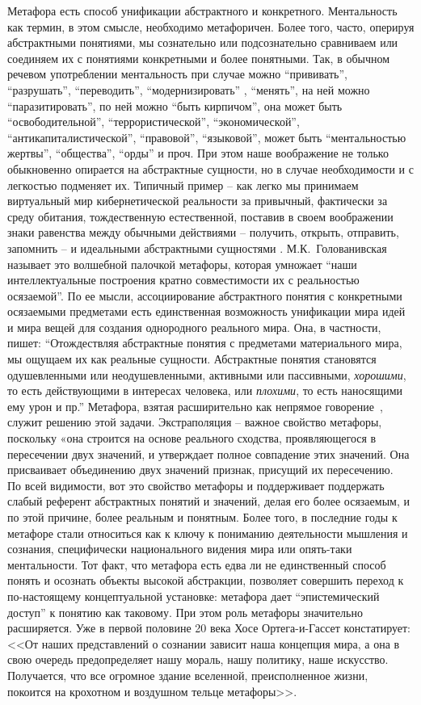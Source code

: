Метафора есть способ унификации абстрактного и конкретного. Ментальность как термин,
в этом смысле, необходимо метафоричен. Более того, часто, оперируя абстрактными понятиями,
мы сознательно или подсознательно сравниваем или соединяем их с понятиями конкретными и
более понятными. Так, в обычном речевом употреблении ментальность при случае можно ``прививать'',
``разрушать'', ``переводить'', ``модернизировать'' , ``менять'', на ней можно ``паразитировать'',
по ней можно ``быть кирпичом'', она может быть ``освободительной'',
``террористической'', ``экономической'', ``антикапиталистической'', ``правовой'', ``языковой'',
может быть ``ментальностью жертвы'', ``общества'', ``орды'' и проч. При этом наше
воображение не только обыкновенно опирается на абстрактные сущности, но в случае необходимости
и с легкостью подменяет их. Типичный пример -- как легко мы принимаем виртуальный
мир кибернетической реальности за привычный, фактически за среду обитания,
тождественную естественной, поставив в своем воображении знаки равенства между обычными действиями --
получить, открыть, отправить, запомнить -- и идеальными абстрактными сущностями
\autocite{ivanov_virtual}. М.К.~Голованивская называет это волшебной палочкой метафоры,
которая умножает ``наши интеллектуальные построения кратно совместимости их с реальностью осязаемой''.
По ее мысли, ассоциирование абстрактного понятия с конкретными осязаемыми предметами есть
единственная возможность унификации мира идей и мира вещей для создания однородного
реального мира. Она, в частности, пишет: ``Отождествляя абстрактные понятия с предметами материального мира,
мы ощущаем их как реальные сущности. Абстрактные понятия становятся одушевленными или неодушевленными,
активными или пассивными, \emph{хорошими}, то есть действующими в интересах человека, или
\emph{плохими}, то есть наносящими ему урон и пр.'' Метафора, взятая расширительно как непрямое
говорение~\autocite{lingvo_dictionary}, служит решению этой задачи. Экстраполяция --
важное свойство метафоры, поскольку «она строится на основе реального сходства,
проявляющегося в пересечении двух значений, и утверждает полное совпадение этих значений.
Она присваивает объединению двух значений признак, присущий их пересечению.~\autocite[][194--197]{razlogova}
По всей видимости, вот это свойство метафоры и поддерживает поддержать слабый референт
абстрактных понятий и значений, делая его более осязаемым, и по этой причине, более
реальным и понятным. Более того, в последние годы к метафоре стали относиться как к ключу
к пониманию деятельности мышления и сознания, специфически национального видения мира или опять-таки
ментальности. Тот факт, что метафора есть едва ли не единственный способ понять и осознать
объекты высокой абстракции, позволяет совершить переход к по-настоящему концептуальной установке:
метафора дает ``эпистемический доступ'' к понятию как таковому\autocite{boyd}.
При этом роль метафоры значительно расширяется. Уже в первой половине 20 века
Хосе Ортега-и-Гассет констатирует: <<От наших представлений о сознании зависит наша
концепция мира, а она в свою очередь предопределяет нашу мораль, нашу политику,
наше искусство. Получается, что все огромное здание вселенной, преисполненное жизни,
покоится на крохотном и воздушном тельце метафоры>>\autocite[][77]{metaphors}.


